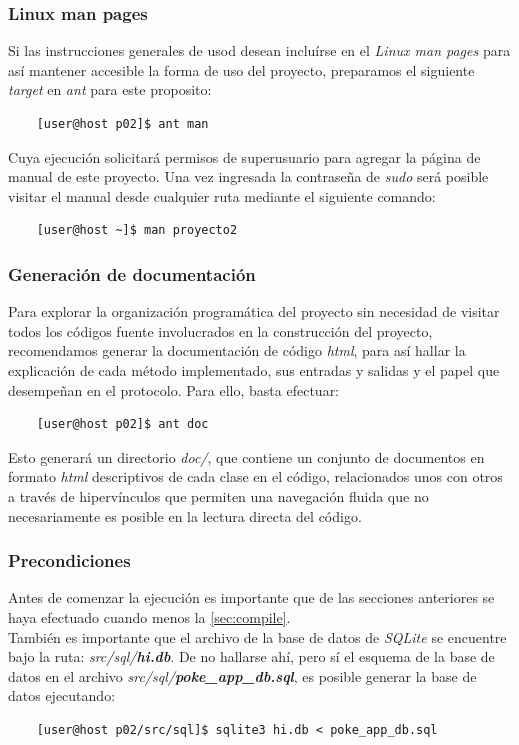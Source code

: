 \documentclass[12pt]{article}
\begin{document}
\subsubsection{Linux man pages}\label{sec:man}
Si las instrucciones generales de usod desean incluírse en el \textit{Linux man pages} para así
mantener accesible la forma de uso del proyecto, preparamos el siguiente \textit{target} en \textit{ant} para este proposito:\\
\begin{verbatim}
    [user@host p02]$ ant man
\end{verbatim}
Cuya ejecución solicitará permisos de superusuario para agregar la página de manual de este proyecto. Una vez ingresada la contraseña de \textit{sudo} será posible visitar el manual desde cualquier ruta mediante el siguiente comando:
\begin{verbatim}
    [user@host ~]$ man proyecto2
\end{verbatim}

\subsubsection{Generación de documentación}\label{sec:doc}
Para explorar la organización programática del proyecto sin necesidad de visitar todos los códigos fuente involucrados en la construcción del proyecto, recomendamos generar la documentación de código \textit{html}, para así hallar la explicación de cada método implementado, sus entradas y salidas y el papel que desempeñan en el protocolo. Para ello, basta efectuar:
\begin{verbatim}
    [user@host p02]$ ant doc
\end{verbatim}
Esto generará un directorio \textit{doc/}, que contiene un conjunto de documentos en formato \textit{html} descriptivos de cada clase en el código, relacionados unos con otros a través de hipervínculos que permiten una navegación fluida que no necesariamente es posible en la lectura directa del código.
\subsubsection{Precondiciones}
Antes de comenzar la ejecución es importante que de las secciones anteriores se haya efectuado cuando menos la \ref{sec:compile}.\\

También es importante que el archivo de la base de datos de \textit{SQLite} se encuentre bajo la ruta:
\textit{src/sql/\textbf{hi.db}}. De no hallarse ahí, pero sí el esquema de la base de datos en el archivo \textit{src/sql/\textbf{poke\_app\_db.sql}}, es posible generar la base de datos ejecutando:
\begin{verbatim}
    [user@host p02/src/sql]$ sqlite3 hi.db < poke_app_db.sql
\end{verbatim}
\end{document}
